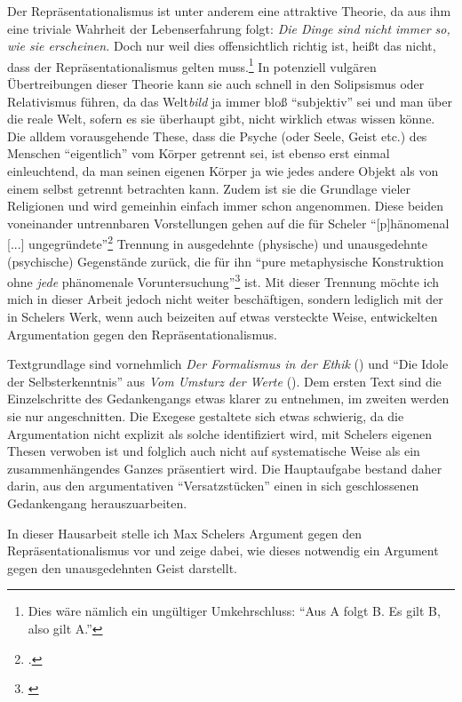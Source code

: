 \documentclass[a4paper, 12pt]{article}
\begin{document}
\begin{onehalfspace}
Der Repräsentationalismus ist unter anderem eine attraktive Theorie, da aus ihm eine triviale Wahrheit der Lebenserfahrung folgt: \emph{Die Dinge sind nicht immer so, wie sie erscheinen.} Doch nur weil dies offensichtlich richtig ist, heißt das nicht, dass der Repräsentationalismus gelten muss.\footnote{Dies wäre nämlich ein ungültiger Umkehrschluss: "`Aus A folgt B. Es gilt B, also gilt A."'} In potenziell vulgären Übertreibungen dieser Theorie kann sie auch schnell in den Solipsismus oder Relativismus führen, da das Welt\emph{bild} ja immer bloß "`subjektiv"' sei und man über die reale Welt, sofern es sie überhaupt gibt, nicht wirklich etwas wissen könne. Die alldem vorausgehende These, dass die Psyche (oder Seele, Geist etc.) des Menschen "`eigentlich"' vom Körper getrennt sei, ist ebenso erst einmal einleuchtend, da man seinen eigenen Körper ja wie jedes andere Objekt als von einem selbst getrennt betrachten kann. Zudem ist sie die Grundlage vieler Religionen und wird gemeinhin einfach immer schon angenommen. Diese beiden voneinander untrennbaren Vorstellungen gehen auf die für Scheler "`[p]hänomenal [...] ungegründete"'\footnote{\Cite[Siehe][S. 229]{scheler-idole}.} Trennung in ausgedehnte (physische) und unausgedehnte (psychische) Gegenstände zurück, die für ihn "`pure metaphysische Konstruktion ohne \emph{jede} phänomenale Voruntersuchung"'\footnote{\Cite[Siehe][S. 229]{scheler-idole}} ist. Mit dieser Trennung möchte ich mich in dieser Arbeit jedoch nicht weiter beschäftigen, sondern lediglich mit der in Schelers Werk, wenn auch beizeiten auf etwas versteckte Weise, entwickelten Argumentation gegen den Repräsentationalismus. 

Textgrundlage sind vornehmlich  \emph{Der Formalismus in der Ethik} (\cite{scheler-ethik}) und "`Die Idole der Selbsterkenntnis"' aus \emph{Vom Umsturz der Werte} (\cite{scheler-idole}). Dem ersten Text sind die Einzelschritte des Gedankengangs etwas klarer zu entnehmen, im zweiten werden sie nur angeschnitten. Die Exegese gestaltete sich etwas schwierig, da die Argumentation nicht explizit als solche identifiziert wird, mit Schelers eigenen Thesen verwoben ist und folglich auch nicht auf systematische Weise als ein zusammenhängendes Ganzes präsentiert wird. Die Hauptaufgabe bestand daher darin, aus den argumentativen "`Versatzstücken"' einen in sich geschlossenen Gedankengang herauszuarbeiten. 

In dieser Hausarbeit stelle ich Max Schelers Argument gegen den Repräsen\-tatio\-na\-lismus vor und zeige dabei, wie dieses notwendig ein Argument gegen den unausgedehnten Geist darstellt. 


\end{onehalfspace}
\end{document}
